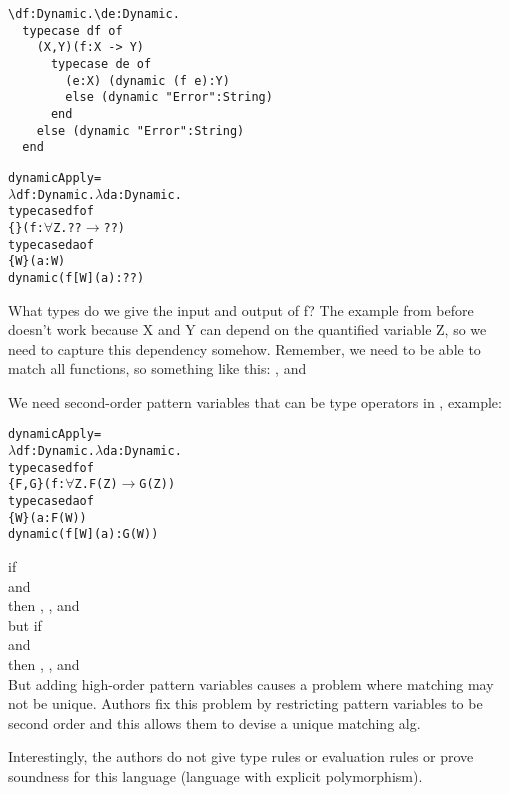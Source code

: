 \documentclass[12pt]{article}	%
\begin{document}
\begin{verbatim}
\df:Dynamic.\de:Dynamic.
  typecase df of
    (X,Y)(f:X -> Y)
      typecase de of
        (e:X) (dynamic (f e):Y)
        else (dynamic "Error":String)
      end
    else (dynamic "Error":String)
  end
\end{verbatim}
	\begin{alltt}
	dynamicApply = 
	  \(\lambda\)df:Dynamic.\(\lambda\)da:Dynamic.
	    typecase df of
	      \{\} (f:\(\forall\)Z.??\(\rightarrow\)??)
	        typecase da of
	          \{W\} (a:W)
	            dynamic( f[W](a):?? )
	\end{alltt}

What types do we give the input and output of f? The example from before doesn't work because X and Y can depend on the quantified variable Z, so we need to capture this dependency somehow. Remember, we need to be able to match all functions, so something like this: , and 

We need second-order pattern variables that can be type operators in \typecase, example:
	\begin{alltt}
	dynamicApply = 
	  \(\lambda\)df:Dynamic.\(\lambda\)da:Dynamic.
	    typecase df of
	      \{F,G\} (f:\(\forall\)Z.F(Z)\(\rightarrow\)G(Z))
	        typecase da of
	          \{W\} (a:F(W))
	            dynamic( f[W](a):G(W) )
	\end{alltt}
	if  \\
	and  \\
	then , , and  \\
	but if  \\
	and  \\
	then , , and  \\

But adding high-order pattern variables causes a problem where matching may not be unique. Authors fix this problem by restricting pattern variables to be second order and this allows them to devise a unique matching alg.

Interestingly, the authors do not give type rules or evaluation rules or prove soundness for this language (language with explicit polymorphism).
\end{document}
